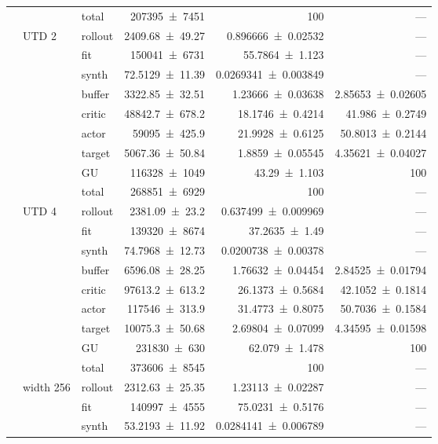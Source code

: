 {\begin{longtable}{@{}lllrrr@{}}
     &  & total & \num{207395+-7451} & \num{100} & --- \\
    \addlinespace[2pt]
     & UTD 2 & rollout & \num{2409.68+-49.27} & \num{0.896666+-0.02532} & --- \\
     &  & fit & \num{150041+-6731} & \num{55.7864+-1.123} & --- \\
     &  & synth & \num{72.5129+-11.39} & \num{0.0269341+-0.003849} & --- \\
     &  & buffer & \num{3322.85+-32.51} & \num{1.23666+-0.03638} & \num{2.85653+-0.02605} \\
     &  & critic & \num{48842.7+-678.2} & \num{18.1746+-0.4214} & \num{41.986+-0.2749} \\
     &  & actor & \num{59095+-425.9} & \num{21.9928+-0.6125} & \num{50.8013+-0.2144} \\
     &  & target & \num{5067.36+-50.84} & \num{1.8859+-0.05545} & \num{4.35621+-0.04027} \\
     &  & GU & \num{116328+-1049} & \num{43.29+-1.103} & 100 \\
     &  & total & \num{268851+-6929} & \num{100} & --- \\
    \addlinespace[2pt]
     & UTD 4 & rollout & \num{2381.09+-23.2} & \num{0.637499+-0.009969} & --- \\
     &  & fit & \num{139320+-8674} & \num{37.2635+-1.49} & --- \\
     &  & synth & \num{74.7968+-12.73} & \num{0.0200738+-0.00378} & --- \\
     &  & buffer & \num{6596.08+-28.25} & \num{1.76632+-0.04454} & \num{2.84525+-0.01794} \\
     &  & critic & \num{97613.2+-613.2} & \num{26.1373+-0.5684} & \num{42.1052+-0.1814} \\
     &  & actor & \num{117546+-313.9} & \num{31.4773+-0.8075} & \num{50.7036+-0.1584} \\
     &  & target & \num{10075.3+-50.68} & \num{2.69804+-0.07099} & \num{4.34595+-0.01598} \\
     &  & GU & \num{231830+-630} & \num{62.079+-1.478} & 100 \\
     &  & total & \num{373606+-8545} & \num{100} & --- \\
    \addlinespace[2pt]
     & width 256 & rollout & \num{2312.63+-25.35} & \num{1.23113+-0.02287} & --- \\
     &  & fit & \num{140997+-4555} & \num{75.0231+-0.5176} & --- \\
     &  & synth & \num{53.2193+-11.92} & \num{0.0284141+-0.006789} & --- \\

\end{longtable}}
